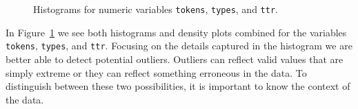 \documentclass[
  letterpaper,
  krantz1]{latex/krantz-mod}
\theoremstyle{definition}
\theoremstyle{definition}
\theoremstyle{remark}
\begin{document}
\begin{figure}[!htb]
\begin{minipage}{0.33\linewidth}
{}


\end{minipage}%
%
\begin{minipage}{0.33\linewidth}



\end{minipage}%

\caption{\label{fig-analysis-belc-histograms}Histograms for numeric
variables \texttt{tokens}, \texttt{types}, and \texttt{ttr}.}

\end{figure}%

In Figure~\ref{fig-analysis-belc-histograms} we see both histograms and
density plots combined for the variables \texttt{tokens},
\texttt{types}, and \texttt{ttr}. Focusing on the details captured in
the histogram we are better able to detect potential outliers.
Outliers can reflect valid values that are simply
extreme or they can reflect something erroneous in the data. To
distinguish between these two possibilities, it is important to know the
context of the data.
\end{document}
